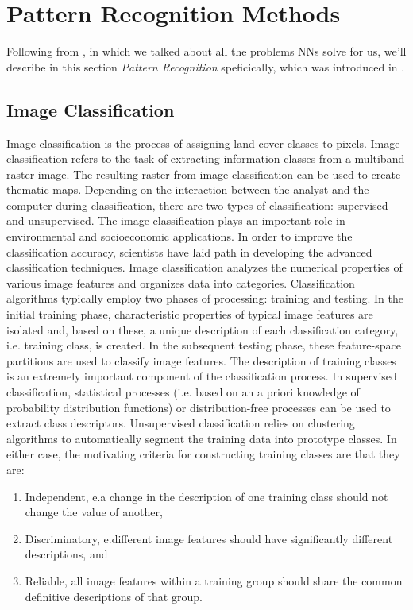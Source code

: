\section{Pattern Recognition Methods}\label{s:patt}

Following from , in which we talked about all the problems NNs solve for us, we'll describe in this section \emph{Pattern Recognition} speficically, which was introduced in .


\subsection{Image Classification}\label{s:patt-class}
Image classification is the process of assigning land cover classes to pixels. Image classification refers to the task of extracting information classes from a multiband raster image. The resulting raster from image classification can be used to create thematic maps. Depending on the interaction between the analyst and the computer during classification, there are two types of classification: supervised and unsupervised. The image classification plays an important role in environmental and socioeconomic applications. In order to improve the classification accuracy, scientists have laid path in developing the advanced classification techniques.
Image classification analyzes the numerical properties of various image features and organizes data into categories. Classification algorithms typically employ two phases of processing: training and testing. In the initial training phase, characteristic properties of typical image features are isolated and, based on these, a unique description of each classification category, i.e. training class, is created. In the subsequent testing phase, these feature-space partitions are used to classify image features. The description of training classes is an extremely important component of the classification process. In supervised classification, statistical processes (i.e. based on an a priori knowledge of probability distribution functions) or distribution-free processes can be used to extract class descriptors. Unsupervised classification relies on clustering algorithms to automatically segment the training data into prototype classes. In either case, the motivating criteria for constructing training classes are that they are:
\begin{enumerate}
	\item Independent, e.a change in the description of one training class should not change the value of another,
	\item Discriminatory, e.different image features should have significantly different descriptions, and
	\item Reliable, all image features within a training group should share the common definitive descriptions of that group.
\end{enumerate}

